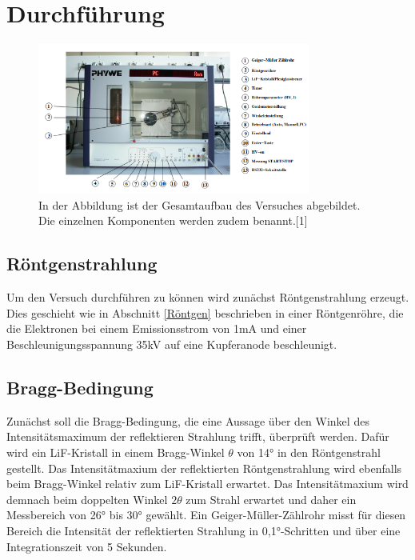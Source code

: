 \documentclass[titlepage = firstcover]{scrartcl}
\begin{document}
            \FloatBarrier

    \newpage
    \section{Durchführung}

    \FloatBarrier

    \begin{figure}[h]
      \centering
      \includegraphics[width = 0.8\textwidth]{Aufbau.png}
      \caption{In der Abbildung ist der Gesamtaufbau des Versuches abgebildet. Die einzelnen Komponenten werden zudem benannt.[1]}
      \label{fig:Aufbau}
    \end{figure}

    \FloatBarrier

            
        \subsection{Röntgenstrahlung}
          Um den Versuch durchführen zu können wird zunächst Röntgenstrahlung erzeugt. Dies geschieht wie in Abschnitt \ref{Röntgen} beschrieben in einer Röntgenröhre, die die Elektronen bei einem Emissionsstrom
          von 1mA und einer Beschleunigungsspannung 35kV auf eine Kupferanode beschleunigt. 

        \subsection{Bragg-Bedingung}
          Zunächst soll die Bragg-Bedingung, die eine Aussage über den Winkel des Intensitätsmaximum der reflektieren Strahlung trifft, überprüft werden. Dafür wird ein LiF-Kristall in einem 
          Bragg-Winkel $\theta$ von 14° in den Röntgenstrahl gestellt. Das Intensitätmaxium der reflektierten Röntgenstrahlung wird ebenfalls beim Bragg-Winkel relativ zum LiF-Kristall erwartet. 
          Das Intensitätmaxium wird demnach beim doppelten Winkel $2\theta$ zum Strahl erwartet und daher ein Messbereich von 26° bis 30° gewählt. Ein Geiger-Müller-Zählrohr misst
          für diesen Bereich die Intensität der reflektierten Strahlung in 0,1°-Schritten und über eine Integrationszeit von 5 Sekunden.
\end{document}
